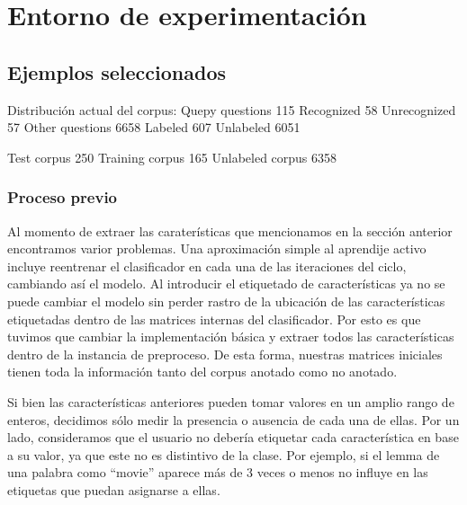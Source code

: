 \chapter{Entorno de experimentación}

\section{Ejemplos seleccionados}


Distribución actual del corpus:
Quepy questions 115
	Recognized 58
	Unrecognized 57
Other questions 6658
	Labeled 607
    Unlabeled 6051

Test corpus 250
Training corpus 165
Unlabeled corpus 6358

\subsection{Proceso previo}

Al momento de extraer las caraterísticas que mencionamos en la sección anterior encontramos varior problemas. Una aproximación simple al aprendije activo incluye reentrenar el clasificador en cada una de las iteraciones del ciclo, cambiando así el modelo. Al introducir el etiquetado de características ya no se puede cambiar el modelo sin perder rastro de la ubicación de las características etiquetadas dentro de las matrices internas del clasificador. Por esto es que tuvimos que cambiar la implementación básica y extraer todos las características dentro de la instancia de preproceso. De esta forma, nuestras matrices iniciales tienen toda la información tanto del corpus anotado como no anotado.

Si bien las características anteriores pueden tomar valores en un amplio rango de enteros, decidimos sólo medir la presencia o ausencia de cada una de ellas. Por un lado, consideramos que el usuario no debería etiquetar cada característica en base a su valor, ya que este no es distintivo de la clase. Por ejemplo, si el lemma de una palabra como ``movie'' aparece más de 3 veces o menos no influye en las etiquetas que puedan asignarse a ellas.

